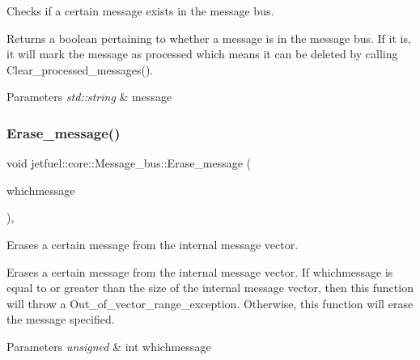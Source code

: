 Checks if a certain message exists in the message bus. 

Returns a boolean pertaining to whether a message is in the message bus. If it is, it will mark the message as processed which means it can be deleted by calling Clear\+\_\+processed\+\_\+messages().


\begin{DoxyParams}{Parameters}
{\em std\+::string} & message \\
\hline
\end{DoxyParams}
\mbox{\label{classjetfuel_1_1core_1_1Message__bus_abf8cc3024d814c80935c3622a4532f7b}} 
\subsubsection{\texorpdfstring{Erase\+\_\+message()}{Erase\_message()}}
{\footnotesize\ttfamily void jetfuel\+::core\+::\+Message\+\_\+bus\+::\+Erase\+\_\+message (\begin{DoxyParamCaption}\item[{const unsigned int}]{whichmessage }\end{DoxyParamCaption})\hspace{0.3cm}{\ttfamily [inline]}, {\ttfamily [protected]}}



Erases a certain message from the internal message vector. 

Erases a certain message from the internal message vector. If whichmessage is equal to or greater than the size of the internal message vector, then this function will throw a Out\+\_\+of\+\_\+vector\+\_\+range\+\_\+exception. Otherwise, this function will erase the message specified.


\begin{DoxyParams}{Parameters}
{\em unsigned} & int whichmessage \\
\hline
\end{DoxyParams}
\mbox{\label{classjetfuel_1_1core_1_1Message__bus_a1703d66bdf3faac3dd7e90edec0962f4}} 
